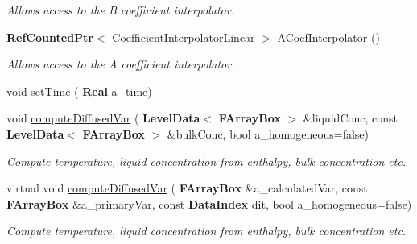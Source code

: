 \begin{DoxyCompactItemize}
\begin{DoxyCompactList}\small\item\em Allows access to the B coefficient interpolator. \end{DoxyCompactList}\item 
\mbox{\label{class_a_m_r_non_linear_multi_comp_op_a3f2f1e5860115bff0d72527de816bc64}} 
\textbf{ Ref\+Counted\+Ptr}$<$ \hyperlink{class_coefficient_interpolator_linear}{Coefficient\+Interpolator\+Linear} $>$ \hyperlink{class_a_m_r_non_linear_multi_comp_op_a3f2f1e5860115bff0d72527de816bc64}{A\+Coef\+Interpolator} ()
\begin{DoxyCompactList}\small\item\em Allows access to the A coefficient interpolator. \end{DoxyCompactList}\item 
void \hyperlink{class_a_m_r_non_linear_multi_comp_op_afb810f3b1d7826edd752a2d90264cc8e}{set\+Time} (\textbf{ Real} a\+\_\+time)
\item 
\mbox{\label{class_a_m_r_non_linear_multi_comp_op_a8a43737a8d5fe5805ebbf3d72388df9b}} 
void \hyperlink{class_a_m_r_non_linear_multi_comp_op_a8a43737a8d5fe5805ebbf3d72388df9b}{compute\+Diffused\+Var} (\textbf{ Level\+Data}$<$ \textbf{ F\+Array\+Box} $>$ \&liquid\+Conc, const \textbf{ Level\+Data}$<$ \textbf{ F\+Array\+Box} $>$ \&bulk\+Conc, bool a\+\_\+homogeneous=false)
\begin{DoxyCompactList}\small\item\em Compute temperature, liquid concentration from enthalpy, bulk concentration etc. \end{DoxyCompactList}\item 
\mbox{\label{class_a_m_r_non_linear_multi_comp_op_a7100d4ee1ab6e020e6fe62522c762b18}} 
virtual void \hyperlink{class_a_m_r_non_linear_multi_comp_op_a7100d4ee1ab6e020e6fe62522c762b18}{compute\+Diffused\+Var} (\textbf{ F\+Array\+Box} \&a\+\_\+calculated\+Var, const \textbf{ F\+Array\+Box} \&a\+\_\+primary\+Var, const \textbf{ Data\+Index} dit, bool a\+\_\+homogeneous=false)
\begin{DoxyCompactList}\small\item\em Compute temperature, liquid concentration from enthalpy, bulk concentration etc. \end{DoxyCompactList}\end{DoxyCompactItemize}
